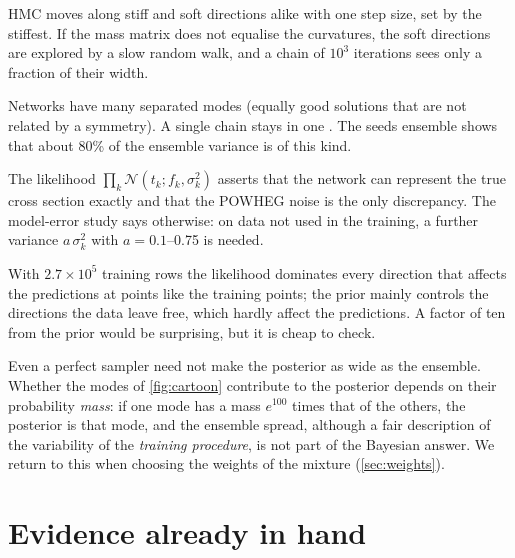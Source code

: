 \begin{description}[leftmargin=1.2em]
  \item[A. Poor sampling within a mode.] HMC moves along stiff and soft directions alike
    with one step size, set by the stiffest. If the mass matrix does not equalise the
    curvatures, the soft directions are explored by a slow random walk, and a chain of
    $10^3$ iterations sees only a fraction of their width.
  \item[B. Modes not visited.] Networks have many separated modes (equally good solutions
    that are not related by a symmetry). A single chain stays in one
    \cite{Izmailov:2021}. The seeds ensemble
    shows that about 80\% of the ensemble variance is of this kind.
  \item[C. An over-confident likelihood.] The likelihood $\prod_k
    \mathcal{N}(t_k; f_k, \sigma_k^2)$ asserts that the network can represent the true
    cross section exactly and that the POWHEG noise is the only discrepancy. The model-error
    study says otherwise: on data not used in the training, a further variance
    $a\,\sigma_k^2$ with $a = 0.1$--0.75 is needed.
  \item[D. The prior.] With $2.7\times10^5$ training rows the likelihood dominates every
    direction that affects the predictions at points like the training points; the prior
    mainly controls the directions the data leave free, which hardly affect the predictions.
    A factor of ten from the prior would be surprising, but it is cheap to check.
\end{description}

\begin{watch}
Even a perfect sampler need not make the posterior as wide as the ensemble. Whether the
modes of \cref{fig:cartoon} contribute to the posterior depends on their probability
\emph{mass}: if one mode has a mass $e^{100}$ times that of the others, the posterior is
that mode, and the ensemble spread, although a fair description of the variability of the
\emph{training procedure}, is not part of the Bayesian answer. We return to this when
choosing the weights of the mixture (\cref{sec:weights}).
\end{watch}

\section{Evidence already in hand}
\label{sec:evidence}

